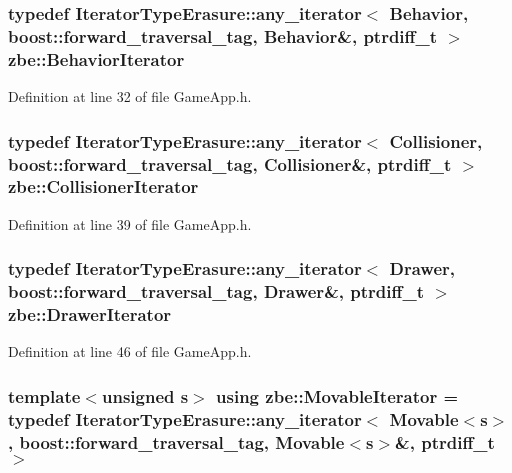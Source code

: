 \subsubsection[{Behavior\+Iterator}]{\setlength{\rightskip}{0pt plus 5cm}typedef Iterator\+Type\+Erasure\+::any\+\_\+iterator$<$ {\bf Behavior}, boost\+::forward\+\_\+traversal\+\_\+tag, {\bf Behavior}\&, ptrdiff\+\_\+t $>$ {\bf zbe\+::\+Behavior\+Iterator}}\label{namespacezbe_a98051e0b03810ff1bbe41c451aa7568e}


Definition at line 32 of file Game\+App.\+h.

\hypertarget{namespacezbe_a38ddb97c007548db7c49a709eafb7b2e}{}
\subsubsection[{Collisioner\+Iterator}]{\setlength{\rightskip}{0pt plus 5cm}typedef Iterator\+Type\+Erasure\+::any\+\_\+iterator$<$ {\bf Collisioner}, boost\+::forward\+\_\+traversal\+\_\+tag, {\bf Collisioner}\&, ptrdiff\+\_\+t $>$ {\bf zbe\+::\+Collisioner\+Iterator}}\label{namespacezbe_a38ddb97c007548db7c49a709eafb7b2e}


Definition at line 39 of file Game\+App.\+h.

\hypertarget{namespacezbe_a5d3dda3dc1f2ee13116b4c5958a47f2f}{}
\subsubsection[{Drawer\+Iterator}]{\setlength{\rightskip}{0pt plus 5cm}typedef Iterator\+Type\+Erasure\+::any\+\_\+iterator$<$ {\bf Drawer}, boost\+::forward\+\_\+traversal\+\_\+tag, {\bf Drawer}\&, ptrdiff\+\_\+t $>$ {\bf zbe\+::\+Drawer\+Iterator}}\label{namespacezbe_a5d3dda3dc1f2ee13116b4c5958a47f2f}


Definition at line 46 of file Game\+App.\+h.

\hypertarget{namespacezbe_aac207741b7b7b641e92f8eac56a8fd88}{}
\subsubsection[{Movable\+Iterator}]{\setlength{\rightskip}{0pt plus 5cm}template$<$unsigned s$>$ using {\bf zbe\+::\+Movable\+Iterator} = typedef Iterator\+Type\+Erasure\+::any\+\_\+iterator$<$ {\bf Movable}$<$s$>$, boost\+::forward\+\_\+traversal\+\_\+tag, {\bf Movable}$<$s$>$\&, ptrdiff\+\_\+t $>$}\label{namespacezbe_aac207741b7b7b641e92f8eac56a8fd88}


